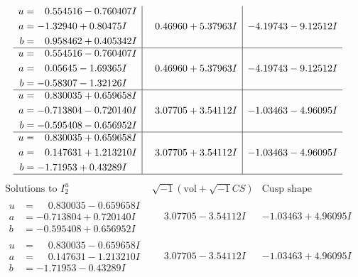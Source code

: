 \documentclass[1p]{elsarticle_modified}
\theoremstyle{definition}
\newcommand{\I}{\sqrt{-1}}
\begin{document}
$$\begin{array}{c|c|c}
\begin{aligned}
u &= \phantom{-}0.554516 - 0.760407 I \\
a &= -1.32940 + 0.80475 I \\
b &= \phantom{-}0.958462 + 0.405342 I\end{aligned}
 & \phantom{-}0.46960 + 5.37963 I & -4.19743 - 9.12512 I \\ \hline\begin{aligned}
u &= \phantom{-}0.554516 - 0.760407 I \\
a &= \phantom{-}0.05645 - 1.69365 I \\
b &= -0.58307 - 1.32126 I\end{aligned}
 & \phantom{-}0.46960 + 5.37963 I & -4.19743 - 9.12512 I \\ \hline\begin{aligned}
u &= \phantom{-}0.830035 + 0.659658 I \\
a &= -0.713804 - 0.720140 I \\
b &= -0.595408 - 0.656952 I\end{aligned}
 & \phantom{-}3.07705 + 3.54112 I & -1.03463 - 4.96095 I \\ \hline\begin{aligned}
u &= \phantom{-}0.830035 + 0.659658 I \\
a &= \phantom{-}0.147631 + 1.213210 I \\
b &= -1.71953 + 0.43289 I\end{aligned}
 & \phantom{-}3.07705 + 3.54112 I & -1.03463 - 4.96095 I\\
 \hline 
 \end{array}$$\newpage$$\begin{array}{c|c|c}  
\text{Solutions to }I^u_{2}& \I (\text{vol} + \sqrt{-1}CS) & \text{Cusp shape}\\
 \hline 
\begin{aligned}
u &= \phantom{-}0.830035 - 0.659658 I \\
a &= -0.713804 + 0.720140 I \\
b &= -0.595408 + 0.656952 I\end{aligned}
 & \phantom{-}3.07705 - 3.54112 I & -1.03463 + 4.96095 I \\ \hline\begin{aligned}
u &= \phantom{-}0.830035 - 0.659658 I \\
a &= \phantom{-}0.147631 - 1.213210 I \\
b &= -1.71953 - 0.43289 I\end{aligned}
 & \phantom{-}3.07705 - 3.54112 I & -1.03463 + 4.96095 I \\ \hline\begin{aligned}

\end{aligned}
\end{array}$$
\end{document}
